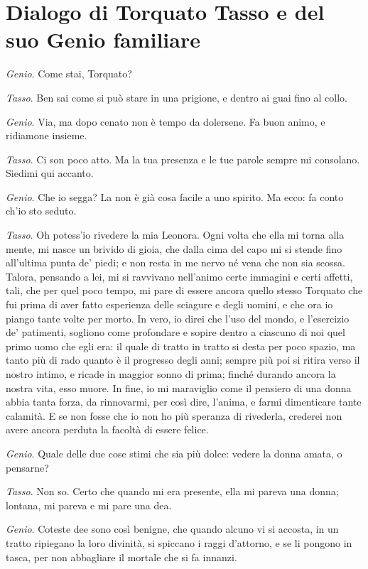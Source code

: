\section{Dialogo di Torquato Tasso e del suo Genio familiare}

\emph{Genio}. Come stai, Torquato?

\emph{Tasso}. Ben sai come si può stare in una prigione, e dentro ai guai fino al collo.

\emph{Genio}. Via, ma dopo cenato non è tempo da dolersene. Fa buon animo, e ridiamone insieme.

\emph{Tasso}. Ci son poco atto. Ma la tua presenza e le tue parole sempre mi consolano. Siedimi qui accanto.

\emph{Genio}. Che io segga? La non è già cosa facile a uno spirito. Ma ecco: fa conto ch'io sto seduto.

\emph{Tasso}. Oh potess'io rivedere la mia Leonora. Ogni volta che ella mi torna alla mente, mi nasce un brivido di gioia, che dalla cima del capo mi si stende fino all'ultima punta de' piedi; e non resta in me nervo né vena che non sia scossa. Talora, pensando a lei, mi si ravvivano nell'animo certe immagini e certi affetti, tali, che per quel poco tempo, mi pare di essere ancora quello stesso Torquato che fui prima di aver fatto esperienza delle sciagure e degli uomini, e che ora io piango tante volte per morto. In vero, io direi che l'uso del mondo, e l'esercizio de' patimenti, sogliono come profondare e sopire dentro a ciascuno di noi quel primo uomo che egli era: il quale di tratto in tratto si desta per poco spazio, ma tanto più di rado quanto è il progresso degli anni; sempre più poi si ritira verso il nostro intimo, e ricade in maggior sonno di prima; finché durando ancora la nostra vita, esso muore. In fine, io mi maraviglio come il pensiero di una donna abbia tanta forza, da rinnovarmi, per così dire, l'anima, e farmi dimenticare tante calamità. E se non fosse che io non ho più speranza di rivederla, crederei non avere ancora perduta la facoltà di essere felice.

\emph{Genio}. Quale delle due cose stimi che sia più dolce: vedere la donna amata, o pensarne?

\emph{Tasso}. Non so. Certo che quando mi era presente, ella mi pareva una donna; lontana, mi pareva e mi pare una dea.

\emph{Genio}. Coteste dee sono così benigne, che quando alcuno vi si accosta, in un tratto ripiegano la loro divinità, si spiccano i raggi d'attorno, e se li pongono in tasca, per non abbagliare il mortale che si fa innanzi.

